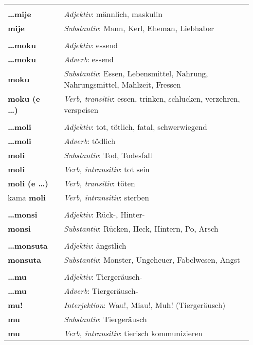 \begin{supertabular}{p{2,5cm}|ll}
 && \\ %
\textbf{\dots mije} && \textit{Adjektiv}: männlich, maskulin \\ 
\textbf{mije} && \textit{Substantiv}: Mann, Kerl, Eheman, Liebhaber \\ 
 && \\ %
\textbf{\dots moku} && \textit{Adjektiv}: essend \\ 
\textbf{\dots moku} && \textit{Adverb}: essend \\ 
\textbf{moku} && \textit{Substantiv}: Essen, Lebensmittel, Nahrung, Nahrungsmittel, Mahlzeit, Fressen \\ 
\textbf{moku (e \dots)} && \textit{Verb, transitiv}: essen, trinken, schlucken, verzehren, verspeisen \\ 
 && \\ %
\textbf{\dots moli} && \textit{Adjektiv}: tot, tötlich, fatal, schwerwiegend \\ 
\textbf{\dots moli} && \textit{Adverb}: tödlich \\ 
\textbf{moli} && \textit{Substantiv}: Tod, Todesfall \\ 
\textbf{moli} && \textit{Verb, intransitiv}: tot sein \\ 
\textbf{moli (e \dots)} && \textit{Verb, transitiv}: töten \\ 
kama \textbf{moli} && \textit{Verb, intransitiv}: sterben \\ 
 && \\ %
\textbf{\dots monsi} && \textit{Adjektiv}: Rück-, Hinter- \\ 
\textbf{monsi} && \textit{Substantiv}: Rücken, Heck, Hintern, Po, Arsch \\ 
 && \\ %
\textbf{\dots monsuta} && \textit{Adjektiv}: ängstlich \\ 
\textbf{monsuta} && \textit{Substantiv}: Monster, Ungeheuer, Fabelwesen, Angst \\ 
 && \\ %
\textbf{\dots mu} && \textit{Adjektiv}: Tiergeräusch- \\ 
\textbf{\dots mu} && \textit{Adverb}: Tiergeräusch- \\ 
\textbf{mu!} && \textit{Interjektion}: Wau!, Miau!, Muh! (Tiergeräusch) \\ 
\textbf{mu} && \textit{Substantiv}: Tiergeräusch \\ 
\textbf{mu} && \textit{Verb, intransitiv}: tierisch kommunizieren \\ 

\end{supertabular}
